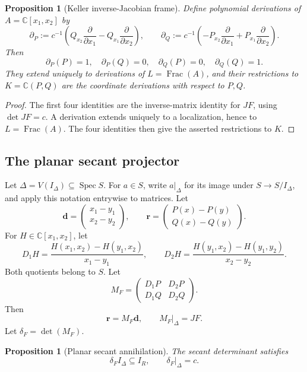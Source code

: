 \documentclass[11pt]{article}
\newtheorem{proposition}[theorem]{Proposition}
\theoremstyle{remark}
\theoremstyle{definition}
\DeclareMathOperator{\Spec}{Spec}
\DeclareMathOperator{\Frac}{Frac}
\newcommand{\C}{\mathbb C}
\begin{document}
\begin{proposition}[Keller inverse-Jacobian frame]
\label{prop:keller-inverse-jacobian-frame}
Define polynomial derivations of \(A=\C[x_1,x_2]\) by
\[
  \partial_P
  :=c^{-1}\left(
      Q_{x_2}\frac{\partial}{\partial x_1}
      -Q_{x_1}\frac{\partial}{\partial x_2}\right),
  \qquad
  \partial_Q
  :=c^{-1}\left(
      -P_{x_2}\frac{\partial}{\partial x_1}
      +P_{x_1}\frac{\partial}{\partial x_2}\right).
\]
Then
\[
  \partial_P(P)=1,
  \quad \partial_P(Q)=0,
  \quad \partial_Q(P)=0,
  \quad \partial_Q(Q)=1.
\]
They extend uniquely to derivations of \(L=\Frac(A)\), and their
restrictions to \(K=\C(P,Q)\) are the coordinate derivations with respect
to \(P,Q\).
\end{proposition}

\begin{proof}
The first four identities are the inverse-matrix identity for \(JF\), using
\(\det JF=c\).  A derivation extends uniquely to a localization, hence to
\(L=\Frac(A)\).  The four identities then give the asserted restrictions
to \(K\).
\end{proof}

\subsection{The planar secant projector}

Let \(\Delta=V(I_\Delta)\subseteq\Spec S\).  For \(a\in S\), write
\(a|_\Delta\) for its image under \(S\to S/I_\Delta\), and apply this
notation entrywise to matrices.
Let
\[
  \mathbf d=
  \begin{pmatrix}
    x_1-y_1\\
    x_2-y_2
  \end{pmatrix},
  \qquad
  \mathbf r=
  \begin{pmatrix}
    P(x)-P(y)\\
    Q(x)-Q(y)
  \end{pmatrix}.
\]
For \(H\in\C[x_1,x_2]\), let
\[
  D_1H
  =
  \frac{H(x_1,x_2)-H(y_1,x_2)}{x_1-y_1},
  \qquad
  D_2H
  =
  \frac{H(y_1,x_2)-H(y_1,y_2)}{x_2-y_2}.
\]
Both quotients belong to \(S\).  Let
\[
  M_F=
  \begin{pmatrix}
    D_1P&D_2P\\
    D_1Q&D_2Q
  \end{pmatrix}.
\]
Then
\[
  \mathbf r=M_F\mathbf d,
  \qquad
  M_F\big|_\Delta=JF.
\]
Let \(\delta_F=\det(M_F)\).

\begin{proposition}[Planar secant annihilation]
\label{prop:secant-annihilator}
The secant determinant satisfies
\[
  \delta_F I_\Delta\subseteq I_R,
  \qquad
  \delta_F\big|_\Delta=c.
\]
\end{proposition}
\end{document}
